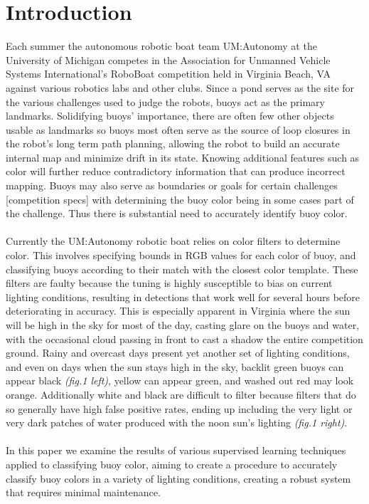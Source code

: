 \documentclass{article} %
\begin{document}
\section{Introduction}
Each summer the autonomous robotic boat team UM:Autonomy at the University of Michigan competes in the Association for Unmanned Vehicle Systems International's RoboBoat competition held in Virginia Beach, VA against various robotics labs and other clubs. Since a pond serves as the site for the various challenges used to judge the robots, buoys act as the primary landmarks. Solidifying buoys' importance, there are often few other objects usable as landmarks so buoys most often serve as the source of loop closures in the robot's long term path planning, allowing the robot to build an accurate internal map and minimize drift in its state. Knowing additional features such as color will further reduce contradictory information that can produce incorrect mapping. Buoys may also serve as boundaries or goals for certain challenges [competition specs] with determining the buoy color being in some cases part of the challenge. Thus there is substantial need to accurately identify 
buoy color.
\\\\Currently the UM:Autonomy robotic boat relies on color filters to determine color. This involves specifying bounds in RGB values for each color of buoy, and classifying buoys according to their match with the closest color template. These filters are faulty because the tuning is highly susceptible to bias on current lighting conditions, resulting in detections that work well for several hours before deteriorating in accuracy. This is especially apparent in Virginia where the sun will be high in the sky for most of the day, casting glare on the buoys and water, with the occasional cloud passing in front to cast a shadow the entire competition ground. Rainy and overcast days present yet another set of lighting conditions, and even on days when the sun stays high in the sky, backlit green buoys can appear black \textit{(fig.1 left)}, yellow can appear green, and washed out red may look orange. Additionally white and black are difficult to filter because filters that do so generally have high false positive rates, ending up including the very light or very dark patches of water produced with the 
noon sun's lighting \textit{(fig.1 right)}.
\\\\In this paper we examine the results of various supervised learning techniques applied to classifying buoy color, aiming to create a procedure to accurately classify buoy colors in a variety of lighting conditions, creating a robust system that requires minimal maintenance.
\end{document}
